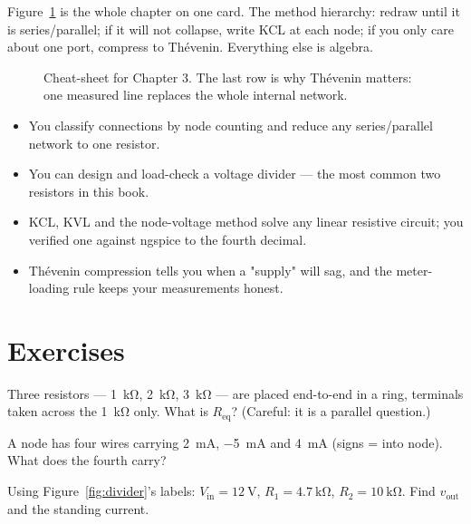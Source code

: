 Figure~\ref{fig:cheatsheet} is the whole chapter on one card. The method
hierarchy: redraw until it is series/parallel; if it will not collapse, write
KCL at each node; if you only care about one port, compress to Th\'evenin.
Everything else is algebra.

\begin{figure}[htbp]
\centering

\caption{Cheat-sheet for Chapter 3. The last row is why Th\'evenin matters:
one measured line replaces the whole internal network.}
\label{fig:cheatsheet}
\end{figure}

\begin{wins}
\begin{itemize}
\item You classify connections by node counting and reduce any
series/parallel network to one resistor.
\item You can design and load-check a voltage divider — the most common two
resistors in this book.
\item KCL, KVL and the node-voltage method solve any linear resistive
circuit; you verified one against ngspice to the fourth decimal.
\item Th\'evenin compression tells you when a "supply" will sag, and the
meter-loading rule keeps your measurements honest.
\end{itemize}
\end{wins}

\section*{Exercises}

\begin{exercise}[easy]
Three resistors — \qty{1}{\kilo\ohm}, \qty{2}{\kilo\ohm}, \qty{3}{\kilo\ohm} —
are placed end-to-end in a ring, terminals taken across the
\qty{1}{\kilo\ohm} only. What is $R_{\mathrm{eq}}$? (Careful: it is a
parallel question.)
\end{exercise}

\begin{exercise}[easy]
A node has four wires carrying \qty{2}{\milli\ampere},
\qty{-5}{\milli\ampere} and \qty{4}{\milli\ampere} (signs = into node).
What does the fourth carry?
\end{exercise}

\begin{exercise}[easy]
Using Figure~\ref{fig:divider}'s labels: $V_{\mathrm{in}}=\qty{12}{\volt}$,
$R_1=\qty{4.7}{\kilo\ohm}$, $R_2=\qty{10}{\kilo\ohm}$. Find
$v_{\mathrm{out}}$ and the standing current.
\end{exercise}

